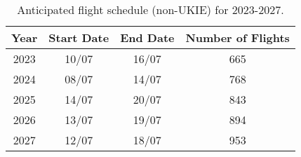 \begin{table}[ht]
\centering
\begin{tabular}{cccc}
  \hline
{\textbf{Year}} & {\textbf{Start Date}} & {\textbf{End Date}} & {\textbf{Number of Flights}} \\ 
  \hline
2023 & 10/07 & 16/07 & 665 \\ 
  2024 & 08/07 & 14/07 & 768 \\ 
  2025 & 14/07 & 20/07 & 843 \\ 
  2026 & 13/07 & 19/07 & 894 \\ 
  2027 & 12/07 & 18/07 & 953 \\ 
   \hline
\end{tabular}
\caption{Anticipated flight schedule (non-UKIE) for 2023-2027. \label{tab:anticipated_schedule}} 
\end{table}
